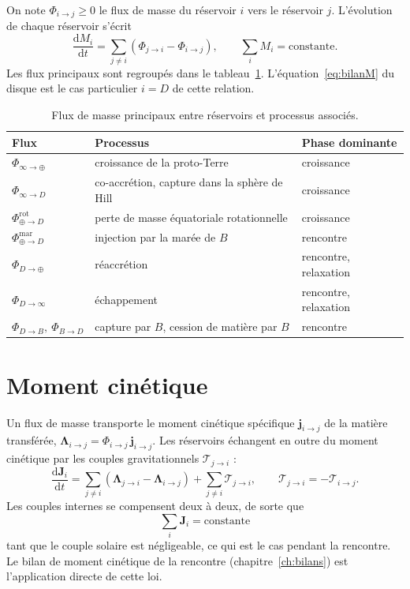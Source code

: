 \documentclass[11pt,a4paper,openany]{report}
\newcommand{\dd}{\mathrm{d}}
\begin{document}
On note $\Phi_{i\to j}\ge0$ le flux de masse du réservoir $i$ vers le réservoir $j$. L'évolution de
chaque réservoir s'écrit
\begin{equation}
\frac{\dd M_i}{\dd t}=\sum_{j\neq i}\left(\Phi_{j\to i}-\Phi_{i\to j}\right),
\qquad
\sum_i M_i=\text{constante}.
\label{eq:flux-masse}
\end{equation}
Les flux principaux sont regroupés dans le tableau~\ref{tab:flux}. L'équation~\eqref{eq:bilanM} du
disque est le cas particulier $i=D$ de cette relation.

\begin{table}[htbp]
\centering
\small
\caption{Flux de masse principaux entre réservoirs et processus associés.}
\label{tab:flux}
\begin{tabular}{lll}
\toprule
\textbf{Flux} & \textbf{Processus} & \textbf{Phase dominante} \\
\midrule
$\Phi_{\infty\to\oplus}$ & croissance de la proto-Terre & croissance \\
$\Phi_{\infty\to D}$ & co-accrétion, capture dans la sphère de Hill & croissance \\
$\Phi_{\oplus\to D}^{\mathrm{rot}}$ & perte de masse équatoriale rotationnelle & croissance \\
$\Phi_{\oplus\to D}^{\mathrm{mar}}$ & injection par la marée de $B$ & rencontre \\
$\Phi_{D\to\oplus}$ & réaccrétion & rencontre, relaxation \\
$\Phi_{D\to\infty}$ & échappement & rencontre, relaxation \\
$\Phi_{D\to B},\ \Phi_{B\to D}$ & capture par $B$, cession de matière par $B$ & rencontre \\
\bottomrule
\end{tabular}
\end{table}

\section{Moment cinétique}

Un flux de masse transporte le moment cinétique spécifique $\mathbf{j}_{i\to j}$ de la matière
transférée, $\boldsymbol{\Lambda}_{i\to j}=\Phi_{i\to j}\,\mathbf{j}_{i\to j}$. Les réservoirs échangent
en outre du moment cinétique par les couples gravitationnels $\boldsymbol{\mathcal{T}}_{j\to i}$ :
\begin{equation}
\frac{\dd\mathbf{J}_i}{\dd t}=\sum_{j\neq i}\left(\boldsymbol{\Lambda}_{j\to i}-\boldsymbol{\Lambda}_{i\to j}\right)
+\sum_{j\neq i}\boldsymbol{\mathcal{T}}_{j\to i},
\qquad
\boldsymbol{\mathcal{T}}_{j\to i}=-\boldsymbol{\mathcal{T}}_{i\to j}.
\label{eq:flux-J}
\end{equation}
Les couples internes se compensent deux à deux, de sorte que
\begin{equation}
\boxed{\;\sum_i\mathbf{J}_i=\text{constante}\;}
\label{eq:conservation-J}
\end{equation}
tant que le couple solaire est négligeable, ce qui est le cas pendant la rencontre. Le bilan de
moment cinétique de la rencontre (chapitre~\ref{ch:bilans}) est l'application directe de cette loi.
\end{document}
